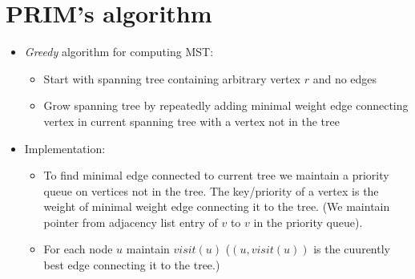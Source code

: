 \documentclass[11pt]{article}
\begin{document}
\section{PRIM's algorithm}
\begin{itemize}
\item {\em Greedy} algorithm for computing MST:
        \begin{itemize}
        \item Start with spanning tree containing arbitrary vertex $r$ and
        no edges
        \item Grow spanning tree by repeatedly adding minimal weight edge
        connecting vertex in current spanning tree with a vertex not in the
        tree
        \end{itemize}
\item Implementation:
  \begin{itemize}
  \item To find minimal edge connected to current tree we maintain a
    priority queue on vertices not in the tree. The key/priority of a
    vertex is the weight of minimal weight edge connecting it to the
    tree. (We maintain pointer from adjacency list entry of $v$ to $v$
    in the priority queue).
  \item For each node $u$ maintain $visit(u)$ ($(u, visit(u))$ is the
    cuurently best edge connecting it to the tree.)
  \end{itemize}
  


\end{itemize}
\end{document}
